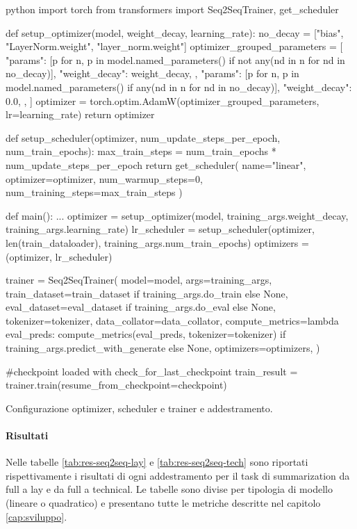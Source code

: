 \documentclass[12pt,a4paper,twoside,openright]{book}
\begin{document}
\begin{customcode}
\begin{mintedbox}{python}
import torch
from transformers import Seq2SeqTrainer, get_scheduler

def setup_optimizer(model, weight_decay, learning_rate):
    no_decay = ["bias", "LayerNorm.weight", "layer_norm.weight"]
    optimizer_grouped_parameters = [
        {
            "params": [p for n, p in model.named_parameters() if not any(nd in n for nd in no_decay)],
            "weight_decay": weight_decay,
        },
        {
            "params": [p for n, p in model.named_parameters() if any(nd in n for nd in no_decay)],
            "weight_decay": 0.0,
        },
    ]
    optimizer = torch.optim.AdamW(optimizer_grouped_parameters, lr=learning_rate)
    return optimizer

def setup_scheduler(optimizer, num_update_steps_per_epoch, num_train_epochs):
    max_train_steps = num_train_epochs * num_update_steps_per_epoch
    return get_scheduler(
        name="linear",
        optimizer=optimizer,
        num_warmup_steps=0,
        num_training_steps=max_train_steps
    )

def main():
    ...
    optimizer = setup_optimizer(model, training_args.weight_decay, training_args.learning_rate)
    lr_scheduler = setup_scheduler(optimizer, len(train_dataloader), training_args.num_train_epochs)
    optimizers = (optimizer, lr_scheduler)

    trainer = Seq2SeqTrainer(
        model=model,
        args=training_args,
        train_dataset=train_dataset if training_args.do_train else None,
        eval_dataset=eval_dataset if training_args.do_eval else None,
        tokenizer=tokenizer,
        data_collator=data_collator,
        compute_metrics=lambda eval_preds: compute_metrics(eval_preds, tokenizer=tokenizer) if training_args.predict_with_generate else None,
        optimizers=optimizers,
    )

    #checkpoint loaded with check_for_last_checkpoint
    train_result = trainer.train(resume_from_checkpoint=checkpoint)    
\end{mintedbox}
\caption{Configurazione optimizer, scheduler e trainer e addestramento.}
\label{lst:training}
\end{customcode}


\paragraph{Risultati}
Nelle tabelle \ref{tab:res-seq2seq-lay} e \ref{tab:res-seq2seq-tech} sono riportati rispettivamente i risultati di ogni addestramento per il task di summarization da full a lay e da full a technical. Le tabelle sono divise per tipologia di modello (lineare o quadratico) e presentano tutte le metriche descritte nel capitolo \ref{cap:sviluppo}.
\end{document}
